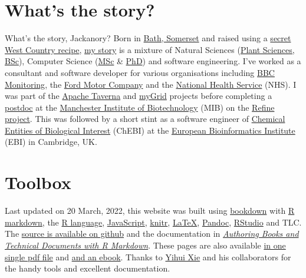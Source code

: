 \documentclass[
  12pt,
]{book}
\begin{document}
\hypertarget{whats-the-story}{%
\section*{What's the story?}\label{whats-the-story}}

What's the story, Jackanory? Born in \href{https://en.wikipedia.org/wiki/Bath,_Somerset}{Bath, Somerset} and raised using a \href{https://en.wikipedia.org/wiki/West_Country}{secret West Country recipe}, \href{https://uk.linkedin.com/in/duncanhull}{my story} is a mixture of Natural Sciences (\href{https://speakerdeck.com/dullhunk/why-study-plants}{Plant Sciences, BSc}), Computer Science (\href{mastersofscience.html}{MSc} \& \href{https://ethos.bl.uk/OrderDetails.do?uin=uk.bl.ethos.497578}{PhD}) and software engineering. I've worked as a consultant and software developer for various organisations including \href{https://en.wikipedia.org/wiki/BBC_Monitoring}{BBC Monitoring}, the \href{https://en.wikipedia.org/wiki/Ford_Motor_Company}{Ford Motor Company} and the \href{https://en.wikipedia.org/wiki/National_Health_Service}{National Health Service} (NHS). I was part of the \href{https://en.wikipedia.org/wiki/Apache_Taverna}{Apache Taverna} and \href{https://en.wikipedia.org/wiki/MyGrid}{myGrid} projects before completing a \href{https://en.wikipedia.org/wiki/Postdoctoral_researcher}{postdoc} at the \href{https://www.mib.manchester.ac.uk/}{Manchester Institute of Biotechnology} (MIB) on the \href{http://www.nactem.ac.uk/pathtext/}{Refine project}. This was followed by a short stint as a software engineer of \href{https://en.wikipedia.org/wiki/ChEBI}{Chemical Entities of Biological Interest} (ChEBI) at the \href{https://en.wikipedia.org/wiki/European_Bioinformatics_Institute}{European Bioinformatics Institute} (EBI) in Cambridge, UK. 🧬🇪🇺

\hypertarget{toolbox}{%
\section*{Toolbox}\label{toolbox}}

Last updated on 20 March, 2022, this website was built using \href{https://bookdown.org}{bookdown} with \href{https://rmarkdown.rstudio.com/}{R markdown}, the \href{https://en.wikipedia.org/wiki/R_(programming_language)}{R language}, \href{https://en.wikipedia.org/wiki/JavaScript}{JavaScript}, \href{https://en.wikipedia.org/wiki/Knitr}{knitr}, \href{https://latex4year1.netlify.app}{LaTeX}, \href{https://pandoc.org/}{Pandoc}, \href{https://rstudio.com/}{RStudio} and TLC. The \href{https://github.com/dullhunk/duncanome}{source is available on github} and the documentation in \emph{\href{https://bookdown.org/yihui/bookdown/}{Authoring Books and Technical Documents with R Markdown}}. These pages are also available \href{https://personalpages.manchester.ac.uk/staff/duncan.hull/duncan-hull.pdf}{in one single pdf file} and \href{https://personalpages.manchester.ac.uk/staff/duncan.hull/duncan-hull.epub}{and an ebook}. Thanks to \href{https://en.wikipedia.org/wiki/Yihui_Xie}{Yihui Xie} and his collaborators for the handy tools and excellent documentation. 🙏
\end{document}
